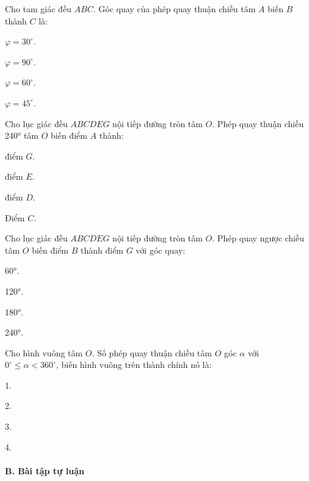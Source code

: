 \documentclass[%
    fontsize=12pt,%
    chapterprefix=false,%
    open=right,%
    twoside=false,%
    numbers=noenddot,%
    headings=optiontohead,%
    final,%
    DIV=15,%
    parskip=half %
]{scrbook}
\begin{document}
\begin{tracnghiem}
\item Cho tam giác đều $ ABC $. Góc quay của phép quay thuận chiều tâm $ A $ biến $ B $ thành $ C $ là:
\begin{options}
  \item $ \varphi = 30^\circ $.
  \item $ \varphi = 90^\circ $.
  \item $ \varphi = 60^\circ $.
  \item $ \varphi = 45^\circ $.
\end{options}

\item Cho lục giác đều $ ABCDEG $ nội tiếp đường tròn tâm $ O $. Phép quay thuận chiều 240° tâm $ O $ biến điểm $ A $ thành:
\begin{options}
  \item điểm $ G $.
  \item điểm $ E $.
  \item điểm $ D $.
  \item Điểm $ C $.
\end{options}

\item Cho lục giác đều $ ABCDEG $ nội tiếp đường tròn tâm $ O $. Phép quay ngược chiều tâm $ O $ biến điểm $ B $ thành điểm $ G $ với góc quay:
\begin{options}
  \item 60°.
  \item 120°.
  \item 180°.
  \item 240°.
\end{options}

\item Cho hình vuông tâm $ O $. Số phép quay thuận chiều tâm $ O $ góc $ \alpha $ với $ 0^\circ \leq \alpha < 360^\circ $, biến hình vuông trên thành chính nó là:
\begin{options}
  \item 1.
  \item 2.
  \item 3.
  \item 4.
\end{options}

\end{tracnghiem}

\paragraph{B. Bài tập tự luận}
\end{document}
